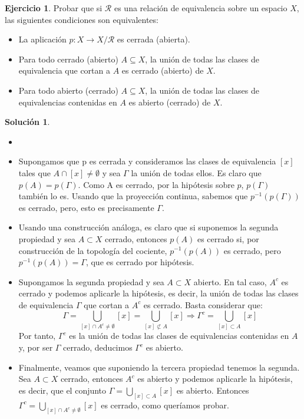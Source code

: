 \documentclass{article}
\theoremstyle{plain}
\theoremstyle{definition}
\newtheorem{exercise}{Ejercicio}
\newtheorem*{sol*}{Solución}
\begin{document}
\newpage
\begin{exercise}
Probar que si $\mathcal{R}$ es una relación de equivalencia sobre un espacio $X$, las siguientes condiciones son equivalentes:
\begin{itemize}
	\item La aplicación $p : X \to X/\mathcal{R}$ es cerrada (abierta).
	\item Para todo cerrado (abierto) $A \subseteq X$, la unión de todas las clases de equivalencia que cortan a $A$ es cerrado (abierto) de $X$.
	\item Para todo abierto (cerrado) $A \subseteq X$, la unión de todas las clases de equivalencias contenidas en $A$ es abierto (cerrado) de $X$.
\end{itemize}
\end{exercise}
\begin{sol*}
\begin{itemize}
\item[]
\item Supongamos que p es cerrada y consideramos las clases de equivalencia $[x]$ tales que $A\cap[x]\neq \emptyset$ y sea $\Gamma$ la unión de todas ellos. Es claro que $p(A) = p(\Gamma)$. Como A es cerrado, por la hipótesis sobre $p$, $p(\Gamma)$ también lo es. Usando que la proyección continua, sabemos que $p^{-1}(p(\Gamma))$ es cerrado, pero, esto es precisamente $\Gamma$.
\item Usando una construcción análoga, es claro que si suponemos la segunda propiedad y sea $A \subset X$ cerrado, entonces $p(A)$ es cerrado si, por construcción de la topología del cociente, $p^{-1}(p(A))$ es cerrado, pero $p^{-1}(p(A)) = \Gamma$, que es cerrado por hipótesis.
\item Supongamos la segunda propiedad y sea $A \subset X$ abierto. En tal caso, $A^c$ es cerrado y podemos aplicarle la hipótesis, es decir, la unión de todas las clases de equivalencia $\Gamma$ que cortan a $A^c$ es cerrado. Basta considerar que:
\[
\Gamma = \bigcup_{[x]\cap A^c \neq \emptyset} [x]  = \bigcup_{[x]\not\subset A} [x] \Rightarrow \Gamma^c = \bigcup_{[x]\subset A} [x]
\]
Por tanto, $\Gamma^c$ es la unión de todas las clases de equivalencias contenidas en $A$ y, por ser $\Gamma$ cerrado, deducimos $\Gamma^c$ es abierto.
\item Finalmente, veamos que suponiendo la tercera propiedad tenemos la segunda. Sea $A\subset X$ cerrado, entonces $A^c$ es abierto y podemos aplicarle la hipótesis, es decir, que el conjunto $\Gamma = \bigcup_{[x]\subset A}[x]$ es abierto. Entonces $\Gamma^c = \bigcup_{[x]\cap A^c \neq \emptyset} [x]$ es cerrado, como queríamos probar.
\end{itemize}
\end{sol*}
\end{document}

